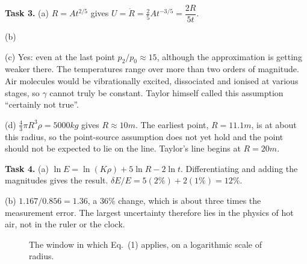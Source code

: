 \documentclass[11pt,a4paper]{article}
\begin{document}
\textbf{Task 3.}
(a) $R=At^{2/5}$ gives $U=\dot R=\frac25At^{-3/5}=\dfrac{2R}{5t}$.

(b)

(c) Yes: even at the last point $p_2/p_0\approx15$, although the approximation is getting weaker there. The temperatures range over more than two orders of magnitude. Air molecules would be vibrationally excited, dissociated and ionised at various stages, so $\gamma$ cannot truly be constant. Taylor himself called this assumption ``certainly not true''.\\

(d) $\frac43\pi R^3\rho=5000\unit{kg}$ gives $R\approx10\unit{m}$. The earliest point, $R=11.1\unit{m}$, is at about this radius, so the point-source assumption does not yet hold and the point should not be expected to lie on the line. Taylor's line begins at $R=20\unit{m}$.

\textbf{Task 4.}
(a) $\ln E=\ln(K\rho)+5\ln R-2\ln t$. Differentiating and adding the magnitudes gives the result. $\delta E/E=5(2\%)+2(1\%)=12\%$.

(b) $1.167/0.856=1.36$, a 36\% change, which is about three times the measurement error. The largest uncertainty therefore lies in the physics of hot air, not in the ruler or the clock.

\begin{figure}[h]
\centering
{}
\caption{The window in which Eq.~(1) applies, on a logarithmic scale of radius.}
\end{figure}
\end{document}
